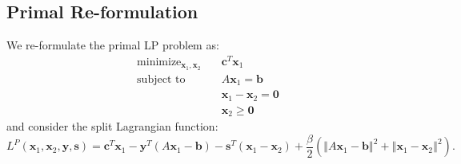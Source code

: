\documentclass{article}
\begin{document}
\subsection*{Primal Re-formulation}
We re-formulate the primal LP problem as:
\begin{align}
\text{minimize}_{ \mathbf{x}_{1}, \mathbf{x}_{2}} &\quad \mathbf{c}^T\mathbf{x}_1 \tag{OPT3}\label{OPT3} \\
\text{subject to  \ \  } &\quad  A \mathbf{x}_{1} = \mathbf{b}  \nonumber \\
&\quad \mathbf{x}_{1}  - \mathbf{x}_{2} = \mathbf{0}  \nonumber \\
&\quad \mathbf{x}_{2} \geq \mathbf{0} \nonumber 
\end{align}
and consider the split Lagrangian function:
\[
L^{P}(\mathbf{x}_{1},\mathbf{x}_{2},\mathbf{y} ,\mathbf{s})=\mathbf{c}^{T}\mathbf{x}_{1}-\mathbf{y}^{T}\left(A\mathbf{x}_{1}-\mathbf{b}\right)-\mathbf{s}^{T}\left(\mathbf{x}_{1}-\mathbf{x}_{2}\right)+\frac{\beta}{2}\left(\left\Vert A\mathbf{x}_{1}-\mathbf{b}\right\Vert ^{2}+\left\Vert \mathbf{x}_{1}-\mathbf{x}_{2}\right\Vert ^{2}\right).
\]
\end{document}
